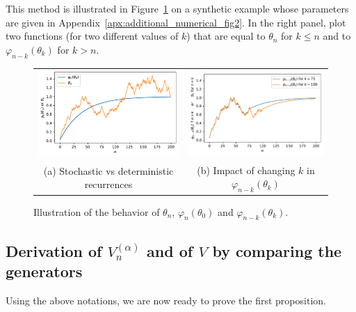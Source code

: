 \documentclass{article}
\newcommand\toA{^{(\alpha)}}
\begin{document}
This method is illustrated in Figure~\ref{fig:generator} on a synthetic example whose parameters are given in Appendix~\ref{apx:additional_numerical_fig2}. 
In the right panel, plot two functions (for two different values of $k$) that are equal to $\theta_n$ for $k\le n$ and to $\varphi_{n-k}(\theta_k)$ for $k>n$. 

\begin{figure}[ht]
    \centering
    \begin{tabular}{@{}c@{}c@{}}
        \includegraphics[width=.45\linewidth]{comparison_systems.pdf}
        &\includegraphics[width=.45\linewidth]{comparison_generators.pdf}
        \\
        (a) Stochastic vs deterministic recurrences
        & (b) Impact of changing $k$ in $\varphi_{n-k}(\theta_{k})$
    \end{tabular}
    \caption{Illustration of the behavior of $\theta_n$, $\varphi_{n}(\theta_0)$ and $\varphi_{n-k}(\theta_k)$.}
    \label{fig:generator}
\end{figure}

\subsection{Derivation of \texorpdfstring{$V\toA_{n}$}{Vαn} and of $V$ by comparing the generators}

Using the above notations, we are now ready to prove the first proposition. 
\end{document}
